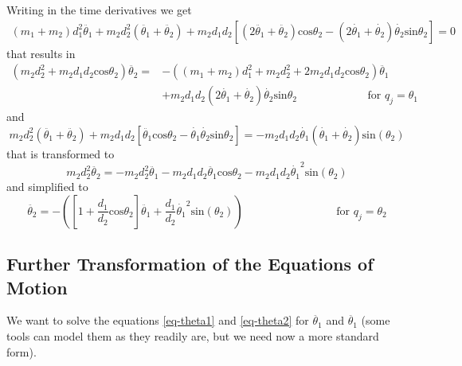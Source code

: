\documentclass[12pt]{article}
\begin{document}
Writing in the time derivatives we get
\begin{equation*}
\begin{split}
  (m_1 + m_2) d_1^2 \ddot{\theta_1} 
 + m_2 d_2^2 (\ddot{\theta_1} + \ddot{\theta_2})
 + m_2 d_1 d_2 [(2 \ddot{\theta_1} + \ddot{\theta_2}) \mathrm{cos}\theta_2 - (2 \dot{\theta_1} + \dot{\theta_2})\dot{\theta_2} \mathrm{sin}\theta_2] = 0
\end{split}
\end{equation*}
that results in 
\begin{equation}\label{eq-theta1}
\begin{split}
 \left( m_2 d_2^2 + m_2 d_1 d_2 \mathrm{cos}\theta_2 \right) \ddot{\theta_2} = 
 &- \left( (m_1 + m_2) d_1^2 + m_2 d_2^2 + 2 m_2 d_1 d_2 \mathrm{cos}\theta_2 \right) \ddot{\theta_1}\\ 
 &+ m_2 d_1 d_2 (2 \dot{\theta_1} + \dot{\theta_2}) \dot{\theta_2} \mathrm{sin}\theta_2 
 \qquad \qquad \qquad \text{ for } q_j = \theta_1
\end{split}
\end{equation}
and
\begin{equation*}
 m_2 d_2^2 (\ddot{\theta_1} + \ddot{\theta_2})
 + m_2 d_1 d_2 [\ddot{\theta_1} \mathrm{cos}\theta_2 - \dot{\theta_1} \dot{\theta_2} \mathrm{sin}\theta_2] =
- m_2 d_1 d_2 \dot{\theta_1} (\dot{\theta_1} + \dot{\theta_2}) \mathrm{sin}(\theta_2)
\end{equation*}
that is transformed to
$$m_2 d_2^2 \ddot{\theta_2} =
- m_2 d_2^2 \ddot{\theta_1} - m_2 d_1 d_2 \ddot{\theta_1} \mathrm{cos}\theta_2 
- m_2 d_1 d_2 \dot{\theta_1}^2 \mathrm{sin}(\theta_2)
$$
and simplified to 
\begin{equation}\label{eq-theta2}
 \ddot{\theta_2} = - \left( \left[ 1 + \frac{d_1}{d_2} \mathrm{cos}\theta_2 \right] \ddot{\theta_1} + 
 \frac{d_1}{d_2} \dot{\theta_1}^2 \mathrm{sin}(\theta_2) \right)
  \qquad \qquad \qquad \qquad \text{ for } q_j = \theta_2
\end{equation}

\subsection*{Further Transformation of the Equations of Motion}
We want to solve the equations \eqref{eq-theta1} and \eqref{eq-theta2} for 
$\ddot{\theta_1}$ and $\ddot{\theta_1}$  
(some tools can model them as they readily are, but we need now a more standard form).
\end{document}
